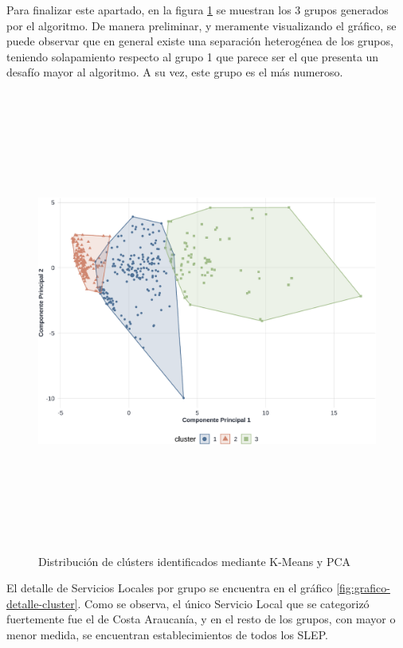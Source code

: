 \documentclass[
  12pt,
  letterpaper,
]{article}
\begin{document}
Para finalizar este apartado, en la figura \ref{fig:grafico-cluster} se muestran los 3 grupos generados por el algoritmo.
De manera preliminar, y meramente visualizando el gráfico, se puede observar que en general existe una separación heterogénea de los grupos, teniendo solapamiento respecto al grupo 1 que parece ser el que presenta un desafío mayor al algoritmo.
A su vez, este grupo es el más numeroso.

\begin{figure}

{\centering \includegraphics[width=0.8\linewidth,height=6in]{tesis_ver_final_files/figure-latex/grafico-cluster-1} 

}

\caption{Distribución de clústers identificados mediante K-Means y PCA}\label{fig:grafico-cluster}
\end{figure}

El detalle de Servicios Locales por grupo se encuentra en el gráfico \ref{fig:grafico-detalle-cluster}.
Como se observa, el único Servicio Local que se categorizó fuertemente fue el de Costa Araucanía, y en el resto de los grupos, con mayor o menor medida, se encuentran establecimientos de todos los SLEP.
\end{document}
